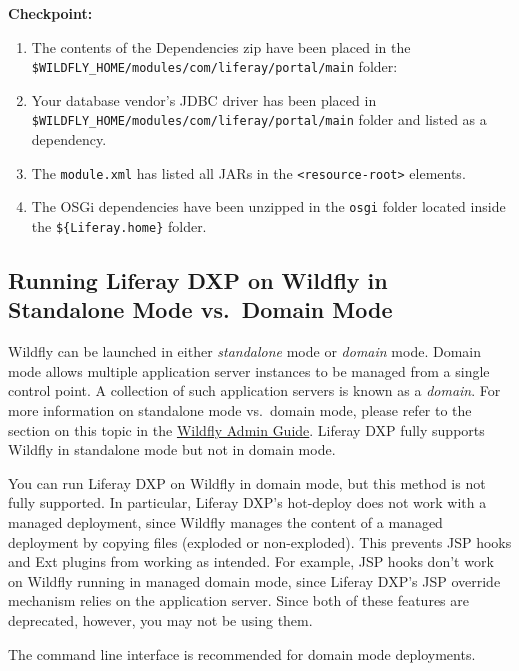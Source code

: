 \textbf{Checkpoint:}

\begin{enumerate}
\def\labelenumi{\arabic{enumi}.}
\tightlist
\item
  The contents of the Dependencies zip have been placed in the
  \texttt{\$WILDFLY\_HOME/modules/com/liferay/portal/main} folder:
\item
  Your database vendor's JDBC driver has been placed in
  \texttt{\$WILDFLY\_HOME/modules/com/liferay/portal/main} folder and
  listed as a dependency.
\item
  The \texttt{module.xml} has listed all JARs in the
  \texttt{\textless{}resource-root\textgreater{}} elements.
\item
  The OSGi dependencies have been unzipped in the \texttt{osgi} folder
  located inside the \texttt{\$\{Liferay.home\}} folder.
\end{enumerate}

\subsection{Running Liferay DXP on Wildfly in Standalone Mode vs.~Domain
Mode}\label{running-liferay-dxp-on-wildfly-in-standalone-mode-vs.-domain-mode}

Wildfly can be launched in either \emph{standalone} mode or
\emph{domain} mode. Domain mode allows multiple application server
instances to be managed from a single control point. A collection of
such application servers is known as a \emph{domain}. For more
information on standalone mode vs.~domain mode, please refer to the
section on this topic in the
\href{https://docs.jboss.org/author/display/WFLY/Admin+Guide\#AdminGuide-Operatingmodes}{Wildfly
Admin Guide}. Liferay DXP fully supports Wildfly in standalone mode but
not in domain mode.

You can run Liferay DXP on Wildfly in domain mode, but this method is
not fully supported. In particular, Liferay DXP's hot-deploy does not
work with a managed deployment, since Wildfly manages the content of a
managed deployment by copying files (exploded or non-exploded). This
prevents JSP hooks and Ext plugins from working as intended. For
example, JSP hooks don't work on Wildfly running in managed domain mode,
since Liferay DXP's JSP override mechanism relies on the application
server. Since both of these features are deprecated, however, you may
not be using them.

The command line interface is recommended for domain mode deployments.

